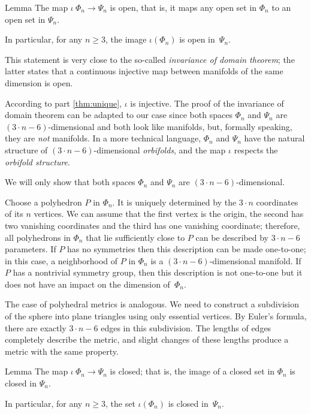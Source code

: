 \begin{thm}{Lemma}
The map $\iota\:\Phi_n\to\Psi_n$ is open, 
that is, it maps any open set in $\Phi_n$ to an open set in $\Psi_n$.

In particular, for any $n\ge 3$, the image $\iota(\Phi_n)$ is open in~$\Psi_n$.
\end{thm}

This statement is very close to the so-called \emph{invariance of domain theorem};
the latter states that a continuous injective map between manifolds of the same dimension is open.

According to part \ref{thm:unique}, $\iota$ is injective.
The proof of the invariance of domain theorem can be adapted to our case since both spaces $\Phi_n$ and $\Psi_n$ are $(3\cdot n-6)$-dimensional and both look like manifolds, but, formally speaking, they are \textit{not} manifolds.
In a more technical language, $\Phi_n$ and $\Psi_n$ have the natural structure of $(3\cdot n-6)$-dimensional \emph{orbifolds},
and the map $\iota$ respects the {}\emph{orbifold structure}.

We will only show that both spaces $\Phi_n$ and $\Psi_n$ are $(3\cdot n-6)$-dimensional.

Choose a polyhedron $P$ in $\Phi_n$.
It is uniquely determined by the $3\cdot n$ coordinates of its $n$ vertices.
We can assume that the first vertex is the origin, the second has two vanishing coordinates and the third has one vanishing coordinate; therefore, all polyhedrons in $\Phi_n$ that lie sufficiently close to $P$ can be described by $3\cdot n-6$ parameters.
If $P$ has no symmetries then this description can be made one-to-one;
in this case, a neighborhood of $P$ in $\Phi_n$ is a $(3\cdot n-6)$-dimensional manifold.
If $P$ has a nontrivial symmetry group, then this description is not one-to-one but it does not have an impact on the dimension of~$\Phi_n$.

The case of polyhedral metrics is analogous.
We need to construct a subdivision of the sphere into plane triangles using only essential vertices.
By Euler's formula, there are exactly $3\cdot n-6$ edges in this subdivision.
The lengths of edges completely describe the metric, and slight changes of these lengths produce a metric with the same property.

\begin{thm}{Lemma}
The map $\iota\:\Phi_n\to\Psi_n$ is closed;
that is, the image of a closed set in $\Phi_n$ is closed in $\Psi_n$.

In particular, for any $n\ge 3$, the set $\iota(\Phi_n)$ is closed in~$\Psi_n$.
\end{thm}

